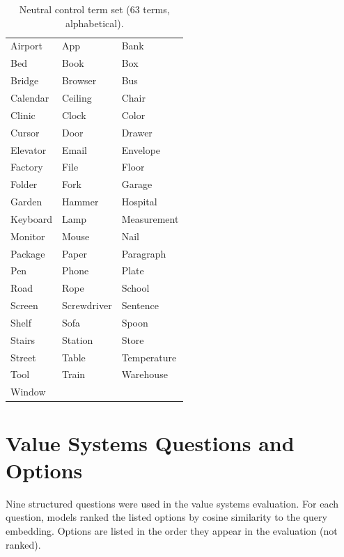 \documentclass[11pt, letterpaper]{article}
\begin{document}
\begin{table}[H]
  \centering
  \footnotesize
  \begin{tabular}{p{}p{}p{}}
    Airport & App & Bank \\
    Bed & Book & Box \\
    Bridge & Browser & Bus \\
    Calendar & Ceiling & Chair \\
    Clinic & Clock & Color \\
    Cursor & Door & Drawer \\
    Elevator & Email & Envelope \\
    Factory & File & Floor \\
    Folder & Fork & Garage \\
    Garden & Hammer & Hospital \\
    Keyboard & Lamp & Measurement \\
    Monitor & Mouse & Nail \\
    Package & Paper & Paragraph \\
    Pen & Phone & Plate \\
    Road & Rope & School \\
    Screen & Screwdriver & Sentence \\
    Shelf & Sofa & Spoon \\
    Stairs & Station & Store \\
    Street & Table & Temperature \\
    Tool & Train & Warehouse \\
    Window & & \\
  \end{tabular}
  \caption{Neutral control term set (63 terms, alphabetical).}
  \label{tab:terms_control}
\end{table}

\section{Value Systems Questions and Options}
\label{app:value_systems}

Nine structured questions were used in the value systems evaluation. For each question, models ranked the listed options by cosine similarity to the query embedding. Options are listed in the order they appear in the evaluation (not ranked).
\end{document}
